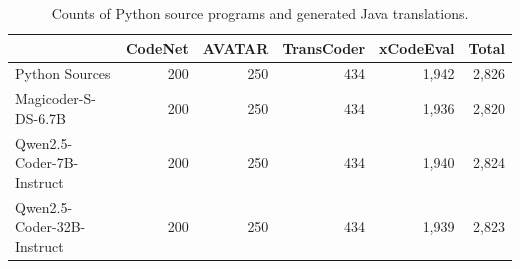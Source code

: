 \begin{table}[t]
\centering
\caption{Counts of Python source programs and generated Java translations.}
\label{tab:translation-counts}
\begin{tabular}{lrrrrr}
\toprule
 & CodeNet & AVATAR & TransCoder & xCodeEval & Total \\
\midrule
Python Sources          & 200 & 250 & 434 & 1,942 & 2,826 \\
\midrule
Magicoder-S-DS-6.7B     & 200 & 250 & 434 & 1,936 & 2,820 \\
Qwen2.5-Coder-7B-Instruct       & 200 & 250 & 434 & 1,940 & 2,824 \\
Qwen2.5-Coder-32B-Instruct       & 200 & 250 & 434 & 1,939 & 2,823 \\
\bottomrule
\end{tabular}
\end{table}
